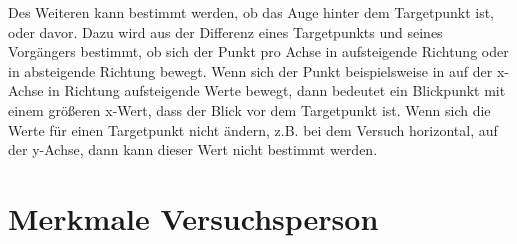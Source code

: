 Des Weiteren kann bestimmt werden, ob das Auge hinter dem Targetpunkt ist, oder davor. Dazu wird aus der Differenz eines Targetpunkts und seines Vorg\"angers bestimmt, ob sich der Punkt pro Achse in aufsteigende Richtung oder in absteigende Richtung bewegt. Wenn sich der Punkt beispielsweise in auf der x-Achse in Richtung aufsteigende Werte bewegt, dann bedeutet ein Blickpunkt mit einem gr\"oßeren x-Wert, dass der Blick vor dem Targetpunkt ist.
Wenn sich die Werte f\"ur einen Targetpunkt nicht \"andern, z.B. bei dem Versuch horizontal, auf der y-Achse, dann kann dieser Wert nicht bestimmt werden.

\section{Merkmale Versuchsperson}